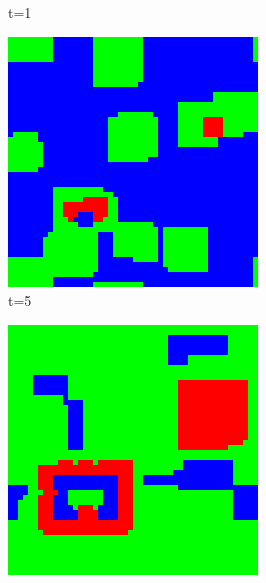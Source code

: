 \documentclass[a4paper, 11pt]{article}
\begin{document}
\begin{landscape}
\begin{figure}[H]
\begin{subfigure}{.20\textwidth}
  \caption{t=1}
\end{subfigure}%
\begin{subfigure}{.20\textwidth}
  \centering
  \includegraphics[width=0.95\linewidth]{ROCK_PAPER_SCISSORS_MOORE_50x50_HighRockPop60_t05}
  \caption{t=5}
\end{subfigure}%
\begin{subfigure}{.20\textwidth}
  \centering
  \includegraphics[width=0.95\linewidth]{ROCK_PAPER_SCISSORS_MOORE_50x50_HighRockPop60_t10}

\end{subfigure}
\end{figure}
\end{landscape}
\end{document}
